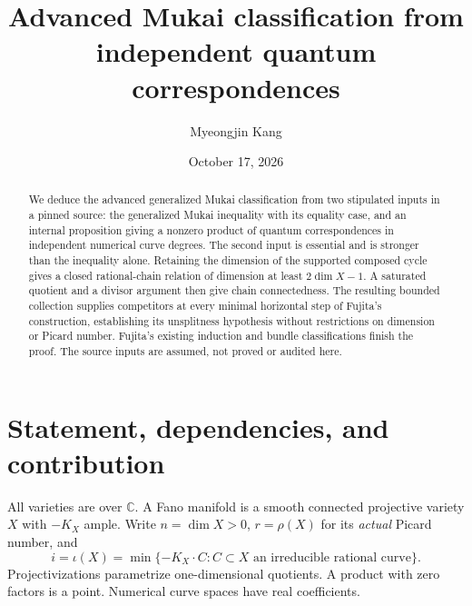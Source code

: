 \documentclass[11pt]{article}
\title{Advanced Mukai classification from independent quantum correspondences}
\author{Myeongjin Kang}
\date{October 17, 2026}
\theoremstyle{definition}\newtheorem{definition}[theorem]{Definition}
\theoremstyle{remark}\newtheorem{remark}[theorem]{Remark}
\newcommand{\CC}{\mathbb C}
\newcommand{\ii}{\iota}
\begin{document}
\maketitle
\begin{abstract}
We deduce the advanced generalized Mukai classification from two stipulated
inputs in a pinned source: the generalized Mukai inequality with its equality
case, and an internal proposition giving a nonzero product of quantum
correspondences in independent numerical curve degrees. The second input is
essential and is stronger than the inequality alone. Retaining the dimension
of the supported composed cycle gives a closed rational-chain relation of
dimension at least $2\dim X-1$. A saturated quotient and a divisor argument
then give chain connectedness. The resulting bounded collection supplies
competitors at every minimal horizontal step of Fujita's construction,
establishing its unsplitness hypothesis without restrictions on dimension or
Picard number. Fujita's existing induction and bundle classifications finish
the proof. The source inputs are assumed, not proved or audited here.
\end{abstract}

\section{Statement, dependencies, and contribution}
All varieties are over $\CC$. A Fano manifold is a smooth connected projective
variety $X$ with $-K_X$ ample. Write $n=\dim X>0$, $r=\rho(X)$ for its
\emph{actual} Picard number, and
\[
 i=\ii(X)=\min\{-K_X\cdot C:C\subset X\text{ an irreducible rational curve}\}.
\]
Projectivizations parametrize one-dimensional quotients. A product with zero
factors is a point. Numerical curve spaces have real coefficients.
\end{document}
